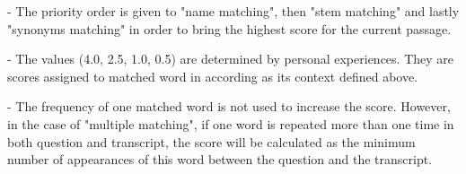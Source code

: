 \documentclass[10pt,a4paper]{article}
\numberwithin{algorithm}{section}  %
\begin{document}
- The priority order is given to "name matching", then "stem matching" and lastly "synonyms matching" in order to bring the highest score for the current passage.

- The values (4.0, 2.5, 1.0, 0.5) are determined by personal experiences. They are scores assigned to matched word in according as its context defined above.

- The frequency of one matched word is not used to increase the score. However, in the case of "multiple matching", if one word is repeated more than one time in both question and transcript, the score will be calculated as the minimum number of appearances of this word between the question and the transcript. 



\newpage


\end{document}
